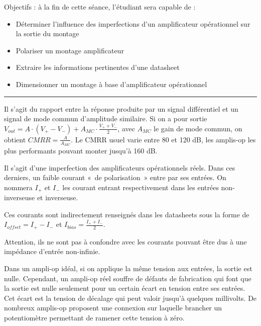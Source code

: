 \documentclass{template/tp}
\author{The Fantastic Four}
\begin{document}

\vspace{-1cm}
Objectifs : à la fin de cette séance, l'étudiant sera capable de :
\begin{itemize}
\item Déterminer l'influence des imperfections d'un amplificateur opérationnel sur la sortie du montage
\item Polariser un montage amplificateur
\item Extraire les informations pertinentes d'une datasheet
\item Dimensionner un montage à base d'amplificateur opérationnel
\end{itemize}
\rule{\linewidth}{.5pt}


{
	Il s'agit du rapport entre la réponse produite par un signal différentiel et un signal de mode commun d'amplitude similaire.
	Si on a pour sortie $V_{out} = A\cdot (V_+ - V_-) + A_{MC} \cdot \frac{V_+ + V_-}{2}$, avec $A_{MC}$ le gain de mode commun, on obtient $CMRR = \frac{A}{A_{MC}}$.
	Le \textsc{CMRR} usuel varie entre 80 et 120 dB, les amplis-op les plus performants pouvant monter jusqu'à 160 dB.
}

{
	Il s'agit d'une imperfection des amplificateurs opérationnels réels.
	Dans ces derniers, un faible courant «~de polarisation~» entre par ses entrées.
	On nommera $I_+$ et $I_-$ les courant entrant respectivement dans les entrées non-inverseuse et inverseuse.

	Ces courants sont indirectement renseignés dans les datasheets sous la forme de $I_{offset} = I_+ - I_-$ et $I_{bias} = \frac{I_+ + I_-}{2}$.

	Attention, ils ne sont pas à confondre avec les courants pouvant être dus à une impédance d'entrée non-infinie.
}

{
	Dans un ampli-op idéal, si on applique la même tension aux entrées, la sortie est nulle.
	Cependant, un ampli-op réel souffre de défauts de fabrication qui font que la sortie est nulle seulement pour un certain écart en tension entre ses entrées.
	Cet écart est la tension de décalage qui peut valoir jusqu'à quelques millivolts.
	De nombreux amplis-op proposent une connexion sur laquelle brancher un potentiomètre permettant de ramener cette tension à zéro.
}
\end{document}
